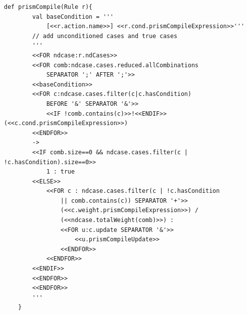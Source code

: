 \begin{lstlisting}[language=xtend,style=eclipse,caption={Traduzione delle transizioni da \ac{lapsa} a \prism{}},label=code:xtend:rules]
	def prismCompile(Rule r){
		val baseCondition = '''
			[<<r.action.name>>] <<r.cond.prismCompileExpression>>'''
		// add unconditioned cases and true cases
		'''
		<<FOR ndcase:r.ndCases>>
		<<FOR comb:ndcase.cases.reduced.allCombinations 
			SEPARATOR ';' AFTER ';'>>
		<<baseCondition>>
		<<FOR c:ndcase.cases.filter(c|c.hasCondition) 
			BEFORE '&' SEPARATOR '&'>>
			<<IF !comb.contains(c)>>!<<ENDIF>>(<<c.cond.prismCompileExpression>>)
		<<ENDFOR>> 
		-> 
		<<IF comb.size==0 && ndcase.cases.filter(c | !c.hasCondition).size==0>>
			1 : true
		<<ELSE>>
			<<FOR c : ndcase.cases.filter(c | !c.hasCondition 
				|| comb.contains(c)) SEPARATOR '+'>>
				(<<c.weight.prismCompileExpression>>) /
				(<<ndcase.totalWeight(comb)>>) :
				<<FOR u:c.update SEPARATOR '&'>>
					<<u.prismCompileUpdate>>
				<<ENDFOR>>
			<<ENDFOR>>
		<<ENDIF>>
		<<ENDFOR>>
		<<ENDFOR>>
		'''
	}
\end{lstlisting}